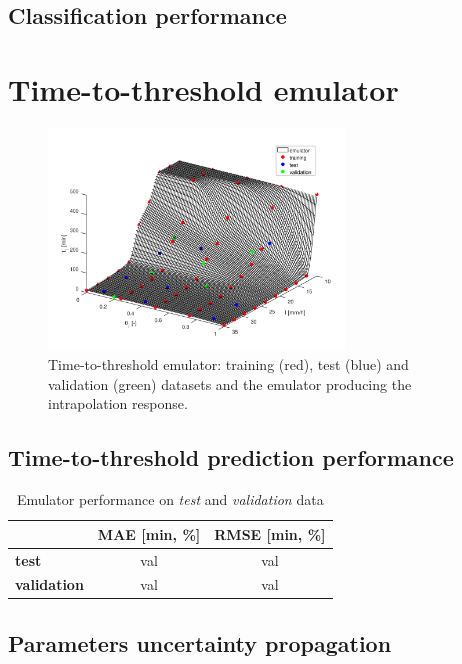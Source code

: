 \subsection{Classification performance}


\section{Time-to-threshold emulator}

\begin{figure}[htpb]
  \centering
  \includegraphics[width=0.7\textwidth]{Figures/emulator.png}
  \caption{Time-to-threshold emulator: training (red), test (blue) and validation (green) datasets and the emulator producing the intrapolation response.}
  \label{fig:}
\end{figure}

\subsection{Time-to-threshold prediction performance}

\begin{table}[htpb]
  \centering
  \caption{Emulator performance on \emph{test} and \emph{validation} data}
  \label{table label}
  \begin{tabular}{lcc}
    \toprule
     & \textbf{MAE [\si{\minute}, \si{\percent}]} & \textbf{RMSE [\si{\minute}, \si{\percent}]} \\
    \midrule
    \textbf{test} & val & val \\
    \textbf{validation} & val & val \\
    \bottomrule
  \end{tabular}
\end{table}


\subsection{Parameters uncertainty propagation}





